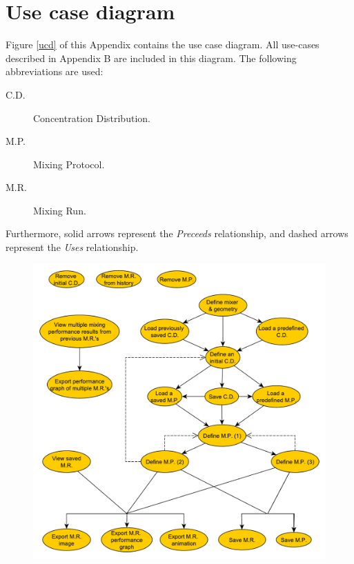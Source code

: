 \chapter{Use case diagram}

Figure \ref{ucd} of this Appendix contains the use case diagram. All use-cases described in Appendix B are included in this diagram. The following abbreviations are used:
\begin{description}
\item[C.D.] Concentration Distribution.
\item[M.P.] Mixing Protocol.
\item[M.R.] Mixing Run.
\end{description}

Furthermore, solid arrows represent the \emph{Preceeds} relationship, and dashed arrows represent the \emph{Uses} relationship.

\begin{figure}[h!]
\begin{center}
\includegraphics[keepaspectratio=true,width=800 pt,height=508 pt]{UseCaseDiagram.pdf}
\end{center}
\end{figure}
